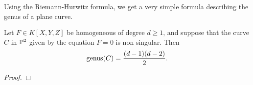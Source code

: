 Using the Riemann-Hurwitz formula, we get a very simple formula describing
the genus of a plane curve.
\begin{corollary}
	\label{cor:genus-formula}
	Let $F \in K[X, Y, Z]$ be homogeneous of degree $d \geq 1$, and suppose that
	the curve $C$ in $\mathbb{P}^2$ given by the equation $F = 0$ is non-singular.
	Then
	\begin{equation*}
		\operatorname{genus}(C) = \frac{(d-1)(d-2)}{2}.
	\end{equation*}
\end{corollary}

\begin{proof}
\end{proof}


